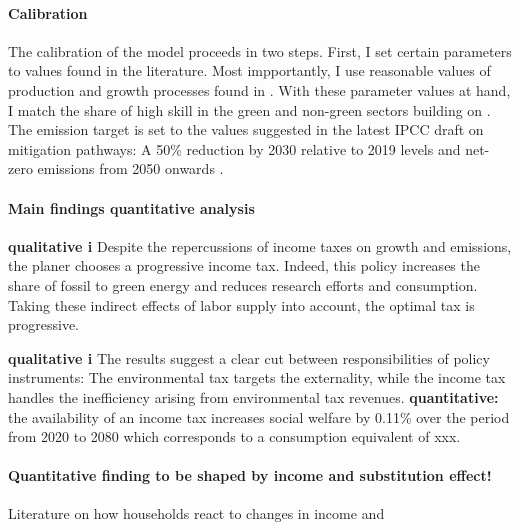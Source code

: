 \paragraph{Calibration}
The calibration of the model proceeds in two steps. First, I set certain parameters to values found in the literature. Most impportantly, I use reasonable values of production and growth processes found in \cite{Fried2018ClimateAnalysis}. %
With these parameter values at hand, I match the share of high skill in the green and non-green sectors building on \cite{Consoli2016DoCapital}. The emission target is set to the values suggested in the latest IPCC draft on mitigation pathways: A 50\% reduction by 2030 relative to 2019 levels and  net-zero emissions from 2050 onwards \citep{IPCC2022}.

\paragraph{Main findings quantitative analysis}
\textbf{qualitative i}
Despite the repercussions of income taxes on growth and emissions, the planer chooses a progressive income tax. 
Indeed, this policy increases the share of fossil to green energy and reduces research efforts and consumption. Taking these indirect effects of labor supply into account, the optimal tax is progressive. 

\textbf{qualitative i}
The results suggest a clear cut between responsibilities of policy instruments: The environmental tax targets the externality, while the income tax handles the inefficiency arising from environmental tax revenues.
\textbf{quantitative:} the availability of an income tax increases social welfare by 0.11\% over the period from 2020 to 2080 which corresponds to a consumption equivalent of xxx. 

\paragraph{Quantitative finding to be shaped by income and substitution effect!}
Literature on how households react to changes in income \cite{Bick2018HowImplications} and \cite{Boppart2019LaborPerspectiveb}


